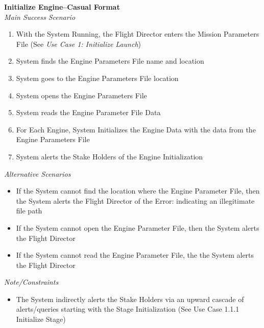 \documentclass[letterpaper]{article}
\begin{document}
\noindent
\textbf{Initialize Engine--Casual Format}\\
\textit{Main Success Scenario}\\
\begin{enumerate}
   \item With the System Running, the Flight Director enters the
      Mission Parameters File (See 
      \textit{Use Case 1:  Initialize Launch})
   \item System finds the Engine Parameters File name and location
   \item System goes to the Engine Parameters File location
   \item System opens the Engine Parameters File
   \item System reads the Engine Parameter File Data
   \item For Each Engine, System Initializes the Engine Data with the
      data from the Engine Parameters File
   \item System alerts the Stake Holders of the Engine Initialization
\end{enumerate}
\textit{Alternative Scenarios}
\begin{itemize}
   \item[2a,3a]If the System cannot find the location where the Engine
      Parameter File, then the System alerts the Flight Director of 
      the Error:  indicating an illegitimate file path
   \item[4a]If the System cannot open the Engine Parameter File, then
      the System alerts the Flight Director
   \item[5a]If the System cannot read the Engine Parameter File, the
      the System alerts the Flight Director
\end{itemize}
\textit{Note/Constraints}
\begin{itemize}
   \item[7a]The System indirectly alerts the Stake Holders via an 
      upward cascade of alerts/queries starting with the Stage 
      Initialization (See Use Case 1.1.1 Initialize Stage)
\end{itemize}
\end{document}
